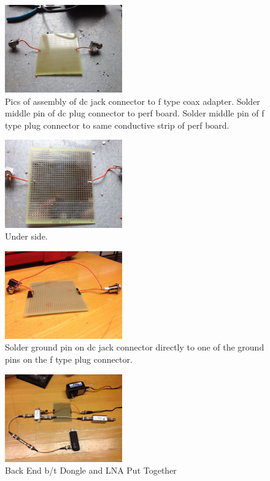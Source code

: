 \documentclass[11pt]{article} %
\begin{document}
\begin{figure}
  \centering
  \caption{Pics of assembly of dc jack connector to f type coax adapter. Solder middle pin of dc plug connector to perf board. Solder middle pin of f type plug connector to same conductive strip of perf board. }
  \includegraphics[width=0.45\textwidth]{lna/08.jpeg}
\end{figure}


\begin{figure}
  \centering
  \caption{Under side. }
  \includegraphics[width=0.45\textwidth]{lna/09.jpeg}
\end{figure}


\begin{figure}
  \centering
  \caption{Solder ground pin on dc jack connector directly to one of the ground pins on the f type plug connector. }
  \includegraphics[width=0.45\textwidth]{lna/10.jpeg}
\end{figure}


\begin{figure}
  \centering
  \caption{Back End b/t Dongle and LNA Put Together }
  \includegraphics[width=0.45\textwidth]{lna/11.jpeg}
\end{figure}
\end{document}
